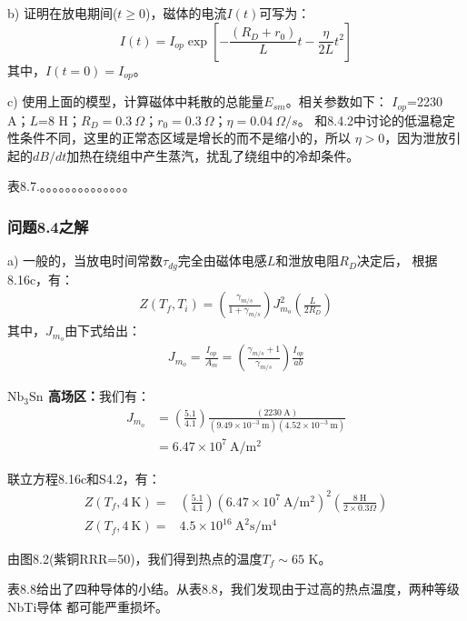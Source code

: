 b) 证明在放电期间($t\ge 0$)，磁体的电流$I(t)$可写为：
\begin{equation}%
I(t)=I_{op}\exp\left[-\frac{(R_D+r_0)}{L}t-\frac{\eta}{2L}t^2\right]
\end{equation}
其中，$I(t=0)=I_{op}$。

c) 使用上面的模型，计算磁体中耗散的总能量$E_{sm}$。相关参数如下：
$I_{op}$=2230 A；$L$=8 H；$R_D=0.3\ \Omega$；$r_0=0.3\ \Omega$；$\eta=0.04\ \Omega/s$。
和8.4.2中讨论的低温稳定性条件不同，这里的正常态区域是增长的而不是缩小的，所以
$\eta>0$，因为泄放引起的$dB/dt$加热在绕组中产生蒸汽，扰乱了绕组中的冷却条件。

表8.7.。。。。。。。。。。。。。。


\subsubsection{问题8.4之解}
a) 一般的，当放电时间常数$\tau_{dg}$完全由磁体电感$L$和泄放电阻$R_D$决定后，
根据8.16c，有：
\begin{align*}%
Z(T_f,T_i)=\left(\frac{\gamma_{m/s}}{1+\gamma_{m/s}}\right)J_{m_o}^{2}\left(\frac{L}{2R_D}\right)\tag{8.16c}
\end{align*}
其中，$J_{m_o}$由下式给出：
\begin{align*}%
J_{m_o}=\frac{I_{op}}{A_m}=\left(\frac{\gamma_{m/s}+1}{\gamma_{m/s}}\right)\frac{I_{op}}{ab}
\end{align*}

\textbf{$\mathrm{Nb_3Sn}$ 高场区：}\quad 我们有： 
\begin{align*}%
J_{m_o}&=\left(\frac{5.1}{4.1}\right)\frac{(2230\ \mathrm{A})}{(9.49\times 10^{-3}\ \mathrm{m})(4.52\times 10^{-3}\ \mathrm{m})} \\
&=6.47\times 10^7\ \mathrm{A/m^2} \tag{S4.1}
\end{align*}

联立方程8.16c和S4.2，有：
\begin{align*}%
Z(T_f,4\ \mathrm{K})=&\left(\frac{5.1}{4.1}\right)(6.47\times 10^7\ \mathrm{A/m^2})^2\left(\frac{8\ \mathrm{H}}{2\times 0.3\Omega}\right)\\
Z(T_f,4\ \mathrm{K})=&4.5\times 10^{16}\ \mathrm{A^2s/m^4}
\end{align*}

由图8.2(紫铜RRR=50)，我们得到热点的温度$T_f\sim 65$ K。

表8.8给出了四种导体的小结。从表8.8，我们发现由于过高的热点温度，两种等级NbTi导体
都可能严重损坏。

